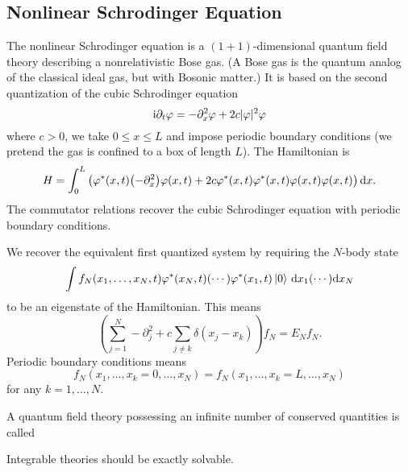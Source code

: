 \subsection{Nonlinear Schrodinger Equation}
\M
The nonlinear Schrodinger equation is a $(1+1)$-dimensional quantum
field theory describing a nonrelativistic Bose gas. (A Bose gas is the
quantum analog of the classical ideal gas, but with Bosonic matter.) It
is based on the second quantization of the cubic Schrodinger equation
\begin{equation}
\mathrm{i}\partial_{t}\varphi = -\partial_{x}^{2}\varphi + 2c|\varphi|^{2}\varphi
\end{equation}
where $c>0$, we take $0\leq x\leq L$ and impose periodic boundary
conditions (we pretend the gas is confined to a box of length $L$). The
Hamiltonian is 
\begin{equation}
H = \int^{L}_{0}\left(\varphi^{*}(x,t)\bigl(-\partial_{x}^{2}\bigr)\varphi(x,t)+2c\varphi^{*}(x,t)\varphi^{*}(x,t)\varphi(x,t)\varphi(x,t)\right)\mathrm{d}{x}.
\end{equation}
The commutator relations recover the cubic Schrodinger equation with
periodic boundary conditions.

We recover the equivalent first quantized system by requiring the
$N$-body state
\begin{equation*}
\int f_{N}(x_{1},\dots,x_{N},t)\varphi^{*}(x_{N},t)(\cdots)\varphi^{*}(x_{1},t)\ket{0}\,\mathrm{d}{x_{1}}(\cdots)\mathrm{d}{x_{N}}
\end{equation*}
to be an eigenstate of the Hamiltonian. This means
\begin{equation}
\left(\sum^{N}_{j=1}-\partial_{j}^{2}+c\sum_{j\neq k}\delta(x_{j}-x_{k})\right)f_{N}
= E_{N}f_{N}.
\end{equation}
Periodic boundary conditions means
\begin{equation}
 f_{N}(x_{1},\dots,x_{k}=0,\dots,x_{N})
=f_{N}(x_{1},\dots,x_{k}=L,\dots,x_{N})
\end{equation}
for any $k=1,\dots,N$.

\begin{definition}
A quantum field theory possessing an infinite number of
conserved quantities is called 
\end{definition}

\begin{theorem}
Integrable theories should be exactly solvable.
\end{theorem}

